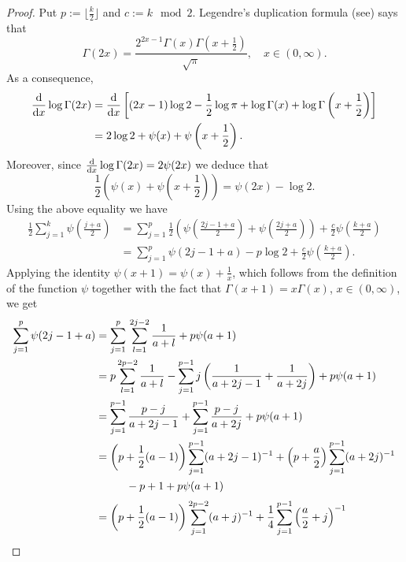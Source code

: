 \documentclass[AHL,Unicode,longabstracts,published]{cedram}
\newcommand{\dd}{{\rm d}}
\begin{document}
\begin{proof}
Put $p:=\lfloor\frac{k}{2}\rfloor$ and $c:= k\mod 2$. Legendre's duplication formula (see\linebreak\cite[p.~138]{NIST}) says that
\[
\Gamma(2x) = \frac{2^{2x-1}\Gamma(x)\Gamma\left(x+\frac{1}{2}\right)}{\sqrt{\pi}},\quad x\in(0,\infty).
\]
As a consequence,
\begin{align*}
\frac{\dd}{\dd x}\log\Gamma(2x) &=\frac{\dd}{\dd x}\left[(2x-1)\log 2-\frac{1}{2}\log\pi+\log\Gamma(x)+\log\Gamma\left(x+\frac{1}{2}\right)\right]\\
&=2\log 2+\psi(x)+\psi\left(x+\frac{1}{2}\right).
\end{align*}
Moreover, since $\frac{\dd}{\dd x}\log\Gamma(2x)=2\psi(2x)$ we deduce that
\begin{equation}\label{eq:DoublingPsi}
\frac{1}{2}\left(\psi(x)+\psi\left(x+\frac12\right)\right)=\psi(2x)-\log 2.
\end{equation}
Using the above equality we have
\begin{equation}\label{eq:1}
\begin{aligned}
\frac12\sum\limits_{j=1}^k\psi\left(\frac{j+a}{2}\right)&=\sum\limits_{j=1}^p\frac{1}{2}\left(\psi\left(\frac{2j-1+a}{2}\right)+\psi\left(\frac{2j+a}{2}\right)\right)+\frac{c}{2}\psi\left(\frac{k+a}{2}\right)\\
&=\sum\limits_{j=1}^p\psi(2j-1+a)-p\log 2+\frac{c}{2}\psi\left(\frac{k+a}{2}\right).
\end{aligned}
\end{equation}
Applying the identity $\psi(x+1)=\psi(x)+\frac{1}{x}$, which follows from the definition of the function $\psi$ together with the fact that $\Gamma(x+1)=x\Gamma(x)$, $x\in(0,\infty)$, we get
\begin{align*}
\sum\limits_{j=1}^p\psi(2j-1+a)&=\sum\limits_{j=1}^p\,\sum\limits_{l=1}^{2j-2}\frac{1}{a+l}+p\psi(a+1)\\
&=p\sum\limits_{l=1}^{2p-2}\frac{1}{a+l}-\sum\limits_{j=1}^{p-1}j\left(\frac{1}{a+2j-1}+\frac{1}{a+2j}\right)+p\psi(a+1)\\
&=\sum\limits_{j=1}^{p-1}\frac{p-j}{a+2j-1}+\sum\limits_{j=1}^{p-1}\frac{p-j}{a+2j}+p\psi(a+1)\\
&=\left(p+\frac{1}{2}(a-1)\right)\sum\limits_{j=1}^{p-1}(a+2j-1)^{-1}+\left(p+\frac{a}{2}\right)\sum\limits_{j=1}^{p-1}(a+2j)^{-1}\\
&\mkern50mu -p+1+p\psi(a+1)\\[0.20em]
&=\left(p+\frac{1}{2}(a-1)\right)\sum\limits_{j=1}^{2p-2}(a+j)^{-1}+\frac{1}{4}\sum\limits_{j=1}^{p-1}\left(\frac{a}{2}+j\right)^{-1}\\

\end{align*}
\end{proof}
\end{document}

